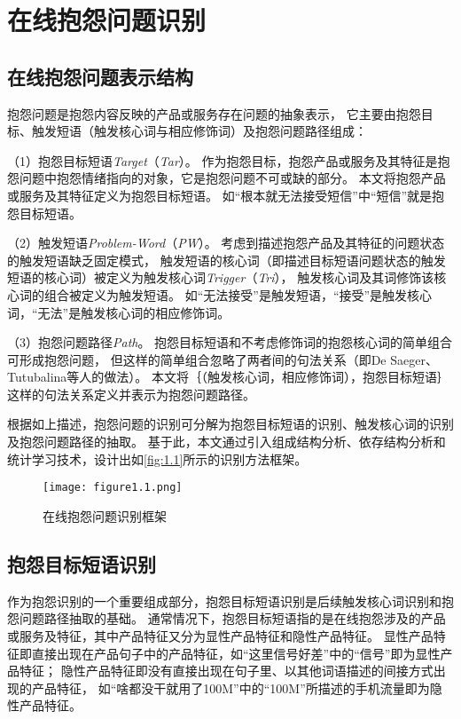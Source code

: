 \section{在线抱怨问题识别}\label{sec:1.3}
\subsection{在线抱怨问题表示结构}\label{subsection:1.3.1}

抱怨问题是抱怨内容反映的产品或服务存在问题的抽象表示，
它主要由抱怨目标、触发短语（触发核心词与相应修饰词）及抱怨问题路径组成：

（1）抱怨目标短语{\itshape Target\/}（{\itshape Tar\/}）。
作为抱怨目标，抱怨产品或服务及其特征是抱怨问题中抱怨情绪指向的对象，它是抱怨问题不可或缺的部分。
本文将抱怨产品或服务及其特征定义为抱怨目标短语。
如“根本就无法接受短信”中“短信”就是抱怨目标短语。

（2）触发短语{\itshape Problem-Word\/}（{\itshape PW\/}）。
考虑到描述抱怨产品及其特征的问题状态的触发短语缺乏固定模式，
触发短语的核心词（即描述目标短语问题状态的触发短语的核心词）被定义为触发核心词\textit{Trigger}（\textit{Tri}），
触发核心词及其词修饰该核心词的组合被定义为触发短语。
如“无法接受”是触发短语，“接受”是触发核心词，“无法”是触发核心词的相应修饰词。

（3）抱怨问题路径{\itshape Path\/}。
抱怨目标短语和不考虑修饰词的抱怨核心词的简单组合可形成抱怨问题，
但这样的简单组合忽略了两者间的句法关系（即De Saeger、Tutubalina等人的做法）。
本文将｛（触发核心词，相应修饰词），抱怨目标短语｝这样的句法关系定义并表示为抱怨问题路径。

根据如上描述，抱怨问题的识别可分解为抱怨目标短语的识别、触发核心词的识别及抱怨问题路径的抽取。
基于此，本文通过引入组成结构分析、依存结构分析和统计学习技术，设计出如\autoref{fig:1.1}所示的识别方法框架。

\begin{figure}[th]

\centering
\texttt{[image: figure1.1.png]}
\vskip -20pt
\caption{在线抱怨问题识别框架}\label{fig:1.1}

\end{figure}

\subsection{抱怨目标短语识别}\label{subsection:1.3.2}

作为抱怨识别的一个重要组成部分，抱怨目标短语识别是后续触发核心词识别和抱怨问题路径抽取的基础。
通常情况下，抱怨目标短语指的是在线抱怨涉及的产品或服务及特征，其中产品特征又分为显性产品特征和隐性产品特征。
显性产品特征即直接出现在产品句子中的产品特征，如“这里信号好差”中的“信号”即为显性产品特征；
隐性产品特征即没有直接出现在句子里、以其他词语描述的间接方式出现的产品特征，
如“啥都没干就用了100M”中的“100M”所描述的手机流量即为隐性产品特征。

